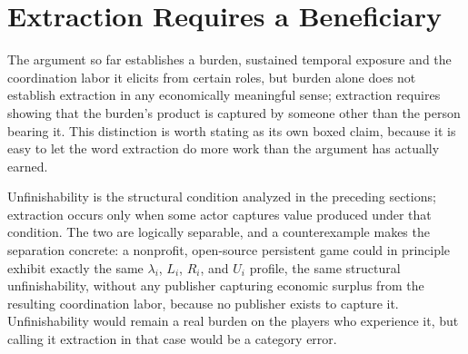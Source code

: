 \documentclass[11pt]{article}
\begin{document}
\section{Extraction Requires a Beneficiary}

The argument so far establishes a burden, sustained temporal exposure and the coordination labor it elicits from certain roles, but burden alone does not establish extraction in any economically meaningful sense; extraction requires showing that the burden's product is captured by someone other than the person bearing it. This distinction is worth stating as its own boxed claim, because it is easy to let the word extraction do more work than the argument has actually earned.
\begin{center}
\end{center}
Unfinishability is the structural condition analyzed in the preceding sections; extraction occurs only when some actor captures value produced under that condition. The two are logically separable, and a counterexample makes the separation concrete: a nonprofit, open-source persistent game could in principle exhibit exactly the same $\lambda_i$, $L_i$, $R_i$, and $U_i$ profile, the same structural unfinishability, without any publisher capturing economic surplus from the resulting coordination labor, because no publisher exists to capture it. Unfinishability would remain a real burden on the players who experience it, but calling it extraction in that case would be a category error.
\end{document}
